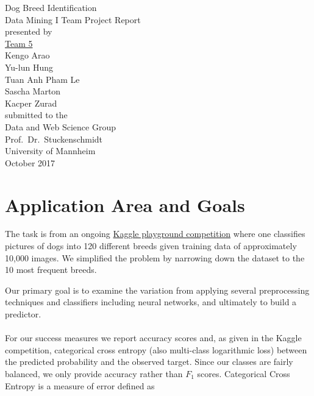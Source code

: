 \documentclass[11pt,titlepage,oneside,openany]{article}
\begin{document}

\begin{titlepage}
	\vspace*{2cm}
	\begin{center}
		{\huge Dog Breed Identification\\}
		\vspace{2cm} 
		{\large Data Mining I Team Project Report\\}
		\vspace{1.7cm}
		{presented by\\ 
			\vspace{1.0cm} 
			\underline{Team 5} \\
			\vspace{0.5cm} 
			Kengo Arao \\
			Yu-lun Hung \\
			Tuan Anh Pham Le \\
			Sascha Marton \\
			Kacper Zurad \\
		}
		\vspace{1cm} 
		{submitted to the\\
			Data and Web Science Group\\
			Prof.\ Dr.\ Stuckenschmidt\\
			University of Mannheim\\} \vspace{2cm}
		{October 2017}
	\end{center}
\end{titlepage}

\tableofcontents

\newpage


\section{Application Area and Goals}
\label{cha:intro}

The task is from an ongoing \href{https://www.kaggle.com/c/dog-breed-identification}{Kaggle playground competition} where one classifies pictures of dogs into 120 different breeds given training data of approximately 10,000 images. We simplified the problem by narrowing down the dataset to the 10 most frequent breeds.

Our primary goal is to examine the variation from applying several preprocessing techniques and classifiers including neural networks, and ultimately to build a predictor.
\\
\\
For our success measures we report accuracy scores and, as given in the Kaggle competition, categorical cross entropy (also multi-class logarithmic loss) between the predicted probability and the observed target. Since our classes are fairly balanced, we only provide accuracy rather than $F_1$ scores.
Categorical Cross Entropy is a measure of error defined as
\end{document}
